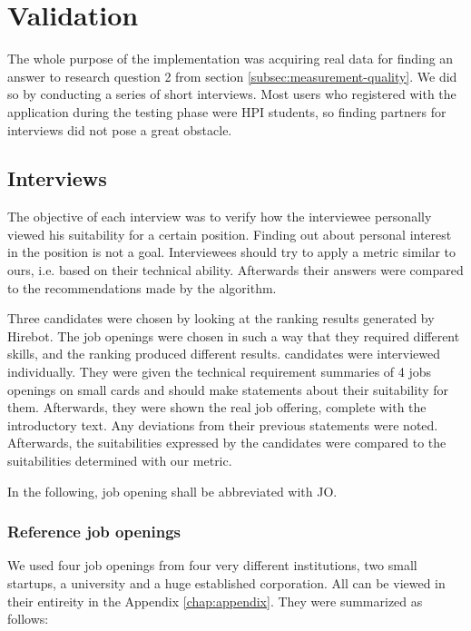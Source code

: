 \chapter{Validation}\label{ch:validation}
The whole purpose of the implementation was acquiring real data for finding an answer to research question 2 from section \ref{subsec:measurement-quality}. We did so by conducting a series of short interviews. Most users who registered with the application during the testing phase were HPI students, so finding partners for interviews did not pose a great obstacle.

\section{Interviews}\label{sec:interviews}
The objective of each interview was to verify how the interviewee personally viewed his suitability for a certain position. Finding out about personal interest in the position is not a goal. Interviewees should try to apply a metric similar to ours, i.e. based on their technical ability. Afterwards their answers were compared to the recommendations made by the algorithm.

Three candidates were chosen by looking at the ranking results generated by Hirebot. The job openings were chosen in such a way that they required different skills, and the ranking produced different results. candidates were interviewed individually. They were given the technical requirement summaries of 4 jobs openings on small cards and should make statements about their suitability for them. Afterwards, they were shown the real job offering, complete with the introductory text. Any deviations from their previous statements were noted. Afterwards, the suitabilities expressed by the candidates were compared to the suitabilities determined with our metric.

In the following, job opening shall be abbreviated with JO.

\subsection{Reference job openings}
We used four job openings from four very different institutions,
two small startups, a university and a huge established corporation.
All can be viewed in their entireity in the Appendix \ref{chap:appendix}.
They were summarized as follows:

